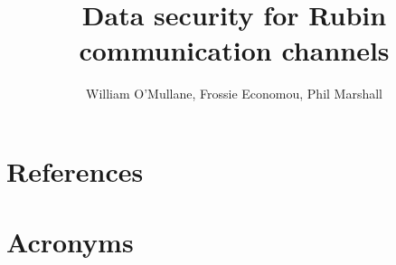 \documentclass[DM,authoryear,toc]{lsstdoc}
\title{Data security for Rubin communication channels}
\author{%
William O'Mullane,
Frossie Economou, 
Phil Marshall
}
\date{\vcsDate}
\begin{document}
\mkshorttitle




\appendix

\section{References} \label{sec:bib}
\renewcommand{\refname}{} %


\section{Acronyms} \label{sec:acronyms}

\end{document}
